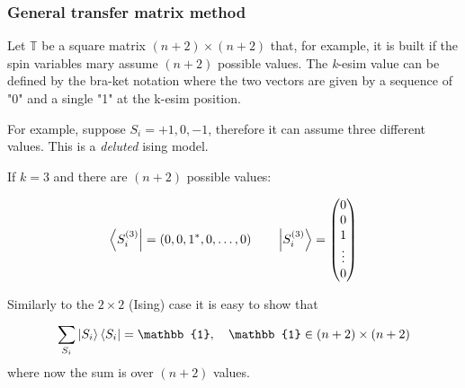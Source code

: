 \documentclass[../main/main.tex]{subfiles}
\begin{document}
\subsubsection{General transfer matrix method}
Let \( \mathbb{T} \) be a square matrix \( (n+2) \times (n+2) \) that, for example, it is built if the spin variables mary assume \( (n+2) \) possible values. The \emph{k}-esim value can be defined by the bra-ket notation where the two vectors are given by a sequence of "0" and a single "1" at the k-esim position.
\begin{example}
  For example, suppose \( S_i = +1,0,-1 \), therefore it can assume three different values.
  This is a \emph{deluted} ising model.

  If \( k=3 \) and there are \( (n+2) \)  possible values:

  \begin{equation}
    \bra{S_i^{(3)}} = (0,0,1^*,0,\dots,0) \qquad   \ket{S_i^{(3)}} = \begin{pmatrix}
      0 \\
      0 \\
      1 \\
      \vdots \\
      0
      \end{pmatrix}
  \end{equation}
\end{example}
Similarly to the \( 2 \times 2 \) (Ising) case it is easy to show that
\begin{equation}
  \sum_{S_i}^{} \ket{S_i} \bra{S_i} = \mathbb{1}, \quad \mathbb{1} \in (n+2)\times(n+2)
\end{equation}
where now the sum is over \( (n+2) \) values.
\end{document}
